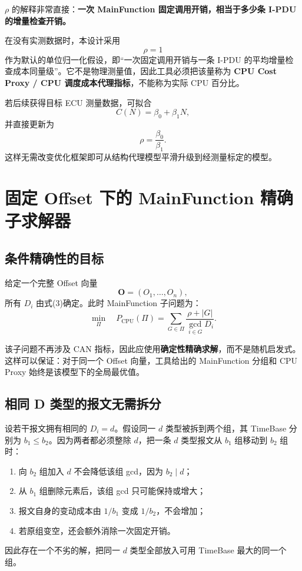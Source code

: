 \documentclass[11pt,a4paper,fontset=none]{ctexart}
\begin{document}
$\rho$ 的解释非常直接：\textbf{一次 MainFunction 固定调用开销，相当于多少条 I-PDU 的增量检查开销。}

在没有实测数据时，本设计采用
\[
\boxed{\rho=1}
\tag{17}
\]
作为默认的单位归一化假设，即“一次固定调用开销与一条 I-PDU 的平均增量检查成本同量级”。它不是物理测量值，因此工具必须把该量称为 \textbf{CPU Cost Proxy / CPU 调度成本代理指标}，不能称为实际 CPU 百分比。

若后续获得目标 ECU 测量数据，可拟合
\[
C(N)=\beta_0+\beta_1N,
\tag{18}
\]
并直接更新为
\[
\rho=\frac{\beta_0}{\beta_1}.
\tag{19}
\]
这样无需改变优化框架即可从结构代理模型平滑升级到经测量标定的模型。

\section{固定 Offset 下的 MainFunction 精确子求解器}

\subsection{条件精确性的目标}

给定一个完整 Offset 向量
\[
\mathbf O=(O_1,\ldots,O_n),
\]
所有 $D_i$ 由式(3)确定。此时 MainFunction 子问题为：
\[
\min_{\Pi}
\quad
P_{\mathrm{CPU}}(\Pi)
=
\sum_{G\in\Pi}
\frac{\rho+|G|}{\gcd_{i\in G}D_i}.
\tag{20}
\]

该子问题不再涉及 CAN 指标，因此应使用\textbf{确定性精确求解}，而不是随机启发式。这样可以保证：对于同一个 Offset 向量，工具给出的 MainFunction 分组和 CPU Proxy 始终是该模型下的全局最优值。

\subsection{相同 D 类型的报文无需拆分}

设若干报文拥有相同的 $D_i=d$。假设同一 $d$ 类型被拆到两个组，其 TimeBase 分别为 $b_1\le b_2$。因为两者都必须整除 $d$，把一条 $d$ 类型报文从 $b_1$ 组移动到 $b_2$ 组时：
\begin{enumerate}
  \item 向 $b_2$ 组加入 $d$ 不会降低该组 gcd，因为 $b_2\mid d$；
  \item 从 $b_1$ 组删除元素后，该组 gcd 只可能保持或增大；
  \item 报文自身的变动成本由 $1/b_1$ 变成 $1/b_2$，不会增加；
  \item 若原组变空，还会额外消除一次固定开销。
\end{enumerate}
因此存在一个不劣的解，把同一 $d$ 类型全部放入可用 TimeBase 最大的同一个组。
\end{document}
